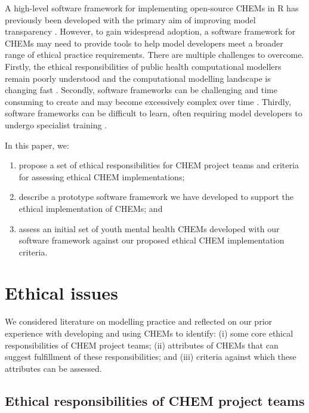 \documentclass[sn-vancouver,Numbered,pdflatex]{sn-jnl}
\theoremstyle{remark}
\theoremstyle{definition}
\begin{document}
A high-level software framework for implementing open-source CHEMs in R has previously been developed with the primary aim of improving model transparency \citep{alarid2019need}. However, to gain widespread adoption, a software framework for CHEMs may need to provide tools to help model developers meet a broader range of ethical practice requirements. There are multiple challenges to overcome. Firstly, the ethical responsibilities of public health computational modellers remain poorly understood \citep{10.3389/fpubh.2017.00068} and the computational modelling landscape is changing fast \citep{calder2018computational}. Secondly, software frameworks can be challenging and time consuming to create and may become excessively complex over time \citep{edwin2014software}. Thirdly, software frameworks can be difficult to learn, often requiring model developers to undergo specialist training \citep{myllarniemi2018development}.

In this paper, we:

\begin{enumerate}
\def\labelenumi{(\roman{enumi})}
\item
  propose a set of ethical responsibilities for CHEM project teams and criteria for assessing ethical CHEM implementations;
\item
  describe a prototype software framework we have developed to support the ethical implementation of CHEMs; and
\item
  assess an initial set of youth mental health CHEMs developed with our software framework against our proposed ethical CHEM implementation criteria.
\end{enumerate}

\hypertarget{ethical-issues}{%
\section{Ethical issues}\label{ethical-issues}}

We considered literature on modelling practice and reflected on our prior experience with developing and using CHEMs to identify: (i) some core ethical responsibilities of CHEM project teams; (ii) attributes of CHEMs that can suggest fulfillment of these responsibilities; and (iii) criteria against which these attributes can be assessed.

\hypertarget{ethical-responsibilities-of-chem-project-teams}{%
\subsection{Ethical responsibilities of CHEM project teams}\label{ethical-responsibilities-of-chem-project-teams}}
\end{document}
